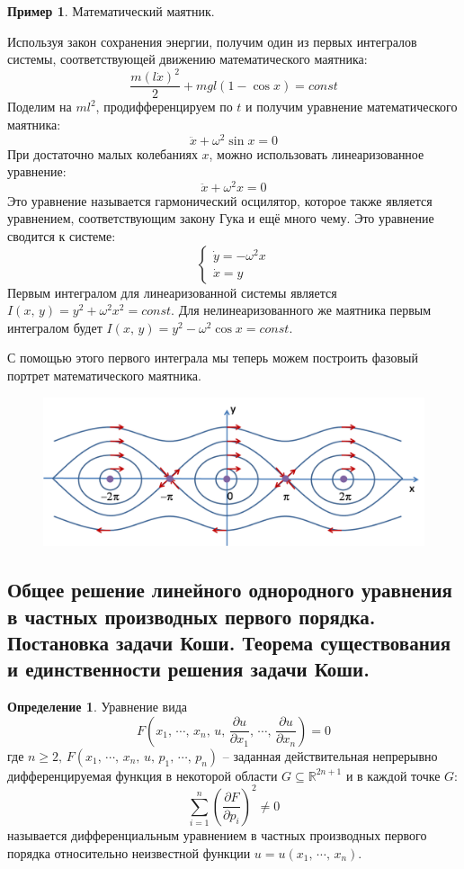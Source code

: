 \documentclass[a4paper,12pt]{article}
\renewcommand{\geq}{\ensuremath{\geqslant}}
\theoremstyle{plain}
\theoremstyle{definition}
\newtheorem{definition}{Определение}[section]
\newtheorem*{example}{Пример}
\theoremstyle{remark}
\begin{document}
\newpage
\begin{example}
	Математический маятник.

	Используя закон сохранения энергии, получим один из первых интегралов системы, соответствующей движению математического маятника:
	\[\frac{m(l\dot{x})^2}{2} + mgl(1 - \cos x) = const\]
	Поделим на $ml^2$, продифференцируем по $t$ и получим уравнение математического маятника:
	\[\ddot{x} + \omega^2\sin x = 0\]
	При достаточно малых колебаниях $x$, можно использовать линеаризованное уравнение:
	\[\ddot{x} + \omega^2x = 0\]
	Это уравнение называется гармонический осцилятор, которое также является уравнением, соответствующим закону Гука и ещё много чему.
	Это уравнение сводится к системе:
	\[
		\begin{cases}
			\dot{y} = -\omega^2x \\
			\dot{x} = y
		\end{cases}
	\]
	Первым интегралом для линеаризованной системы является $I(x,\,y) = y^2 + \omega^2x^2 = const$. Для нелинеаризованного же маятника первым интегралом будет $I(x,\,y) = y^2 - \omega^2\cos x = const$. 

	С помощью этого первого интеграла мы теперь можем построить фазовый портрет математического маятника.
	\begin{figure}[h]
		\includegraphics[scale = 0.7]{img/oscilator.png}
	\end{figure}
\end{example}

\subsection{Общее решение линейного однородного уравнения в частных производных первого порядка. Постановка задачи Коши. Теорема существования и единственности решения задачи Коши.}
\begin{definition}
	Уравнение вида
	\[F\left(x_1,\,\cdots,\,x_n,\, u,\, \frac{\partial u}{\partial x_1},\,\cdots,\,\frac{\partial u}{\partial x_n}\right) = 0\]
	где $n \geq 2,\, F(x_1,\,\cdots,\,x_n,\,u,\,p_1,\,\cdots,\,p_n)$ -- заданная действительная непрерывно дифференцируемая функция в некоторой области $G \subseteq \mathbb{R}^{2n + 1}$ и в каждой точке $G$:
	\[\sum_{i = 1}^n \left(\frac{\partial F}{\partial p_i}\right)^2 \neq 0\]
	называется дифференциальным уравнением в частных производных первого порядка относительно неизвестной функции $u = u(x_1,\,\cdots,\,x_n)$.
\end{definition}
\end{document}
